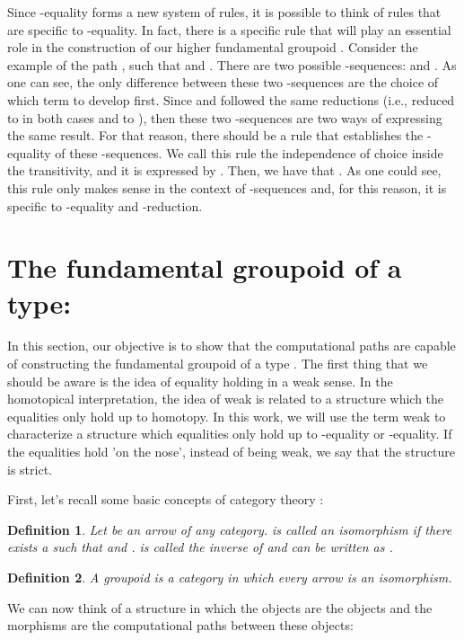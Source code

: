 \documentclass[12pt, a4paper,  oneside, headinclude,footinclude, BCOR5mm]{scrartcl}
\newtheorem{definition}{Definition}[section]
\begin{document}
Since -equality forms a new system of rules, it is possible to think of rules that are specific to -equality. In fact, there is a specific rule that will play an essential role in the construction of our higher fundamental groupoid . Consider the example of the path , such that  and . There are two possible -sequences:  and . As one can see, the only difference between these two -sequences are the choice of which term to develop first. Since  and  followed the same reductions (i.e.,  reduced to  in both cases and  to ), then these two -sequences are two ways of expressing the same result. For that reason, there should be a rule that establishes the -equality of these -sequences. We call this rule the independence of choice inside the transitivity, and it is expressed by . Then, we have that  . As one could see, this rule only makes sense in the context of -sequences and, for this reason, it is specific to -equality and -reduction.


\section{The fundamental groupoid of a type: }

In this section, our objective is to show that the computational paths are capable of constructing the fundamental groupoid of a type . The first thing that we should be aware is the idea of equality holding in a weak sense. In the homotopical interpretation, the idea of weak is related to a structure which the equalities only hold up to homotopy. In this work, we will use the term weak to characterize a structure which equalities only hold up to -equality or -equality. If the equalities hold 'on the nose', instead of being weak, we say that the structure is strict.

First, let's recall some basic concepts of category theory \cite{Steve2}:

\begin{definition}

Let  be an arrow of any category.  is called an isomorphism if there exists a  such that  and .  is called the inverse of  and can be written as .

\end{definition}

\begin{definition}
A groupoid is a category in which every arrow is an isomorphism.
\end{definition}

We can now think of a structure  in which the objects are the objects  and the morphisms are the computational paths between these objects:
\end{document}
